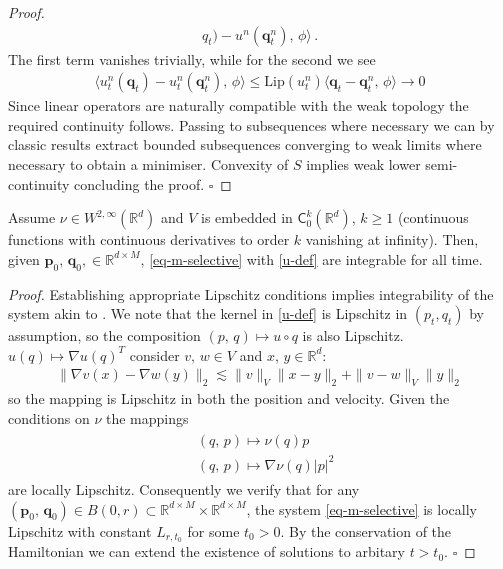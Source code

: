 \documentclass[runningheads]{llncs}
\newcommand{\norm}[2]{\| #1 \|_{ #2 }}
\newcommand{\vnorm}[1]{\norm{ #1 }{V}}
\newcommand{\ltwonorm}[1]{\norm{ #1 }{2}}
\newcommand{\Rd}{\mathbb{R}^{d}}
\newcommand{\RdM}{\mathbb{R}^{d\times M}}
\begin{document}
\begin{proof}
\begin{align*}
q_t)-u^n(\mathbf q_t^n),\,\phi\rangle\,.
\end{align*}
The first term vanishes trivially, while for the second we see
\begin{align*}
\langle u_t^n(\mathbf q_t)-u_t^n(\mathbf q_t^n),\,\phi\rangle \leq \text{Lip}(u_t^n)\langle \mathbf q_t-\mathbf q_t^n,\,\phi\rangle \rightarrow 0
\end{align*}
Since linear operators are naturally compatible with the weak topology the
required continuity follows.  Passing to subsequences where necessary we can by
classic results extract bounded subsequences converging to weak limits where
necessary to obtain a minimiser. Convexity of $S$ implies weak lower
semi-continuity concluding the proof.
{\hfill $\square$}
\end{proof}
\begin{theorem}
Assume $\nu \in W^{2, \infty}(\Rd)$ and $V$ is embedded in
$\textsf{C}_0^k(\Rd)$, $k\geq 1$ (continuous functions with continuous
derivatives to order $k$ vanishing at infinity). Then, given $\mathbf
p_0,\,\mathbf q_0, \in \RdM$, \eqref{eq-m-selective} with \eqref{u-def} are
integrable for all time.
\end{theorem}
\begin{proof}
Establishing appropriate Lipschitz conditions implies integrability of the
system akin to \cite[Theorem 5]{cotter2013bayesian}. We note that the kernel in
\eqref{u-def} is Lipschitz in $(p_t, q_t)$ by assumption, so the composition $(p,\,q) \mapsto
u\circ q$ is also Lipschitz. $u(q)\mapsto\nabla u(q)^T$ consider $v,\,w \in V$ and $x,\,y\in\Rd$:
\begin{align}
\ltwonorm{\nabla v(x) - \nabla w(y)} \lesssim \vnorm{v} \ltwonorm{x-y} + \vnorm{v-w}\ltwonorm{y}
\end{align}
so the mapping is Lipschitz in both the position and velocity. Given the
conditions on $\nu$ the mappings
\begin{align}
  \begin{split}
    & (q,\,p)\mapsto \nu(q)p\\
    &(q,\,p)\mapsto \nabla \nu(q)|p|^2
  \end{split}\label{nu_maps}
\end{align}
are locally Lipschitz. Consequently we verify that for any $(\mathbf
p_0,\,\mathbf q_0)\in B(0,r)\subset \RdM\times\RdM$, the system
\eqref{eq-m-selective} is locally Lipschitz with constant $L_{r,t_0}$ for some
$t_0>0$. By the conservation of the Hamiltonian we can extend the existence of
solutions to arbitary $t>t_0$.
{\hfill $\square$}
\end{proof}
\end{document}
